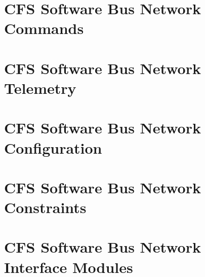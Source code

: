 \documentclass[twoside]{book}
\begin{document}
\chapter{C\-F\-S Software Bus Network Commands}
\label{cfssbncmds}
\hypertarget{cfssbncmds}{}

\chapter{C\-F\-S Software Bus Network Telemetry}
\label{cfssbntlm}
\hypertarget{cfssbntlm}{}

\chapter{C\-F\-S Software Bus Network Configuration}
\label{cfssbncfg}
\hypertarget{cfssbncfg}{}

\chapter{C\-F\-S Software Bus Network Constraints}
\label{cfssbncons}
\hypertarget{cfssbncons}{}

\chapter{C\-F\-S Software Bus Network Interface Modules}
\label{cfssbnmod}
\hypertarget{cfssbnmod}{}


\newpage
{}
{}
\printindex
\end{document}
